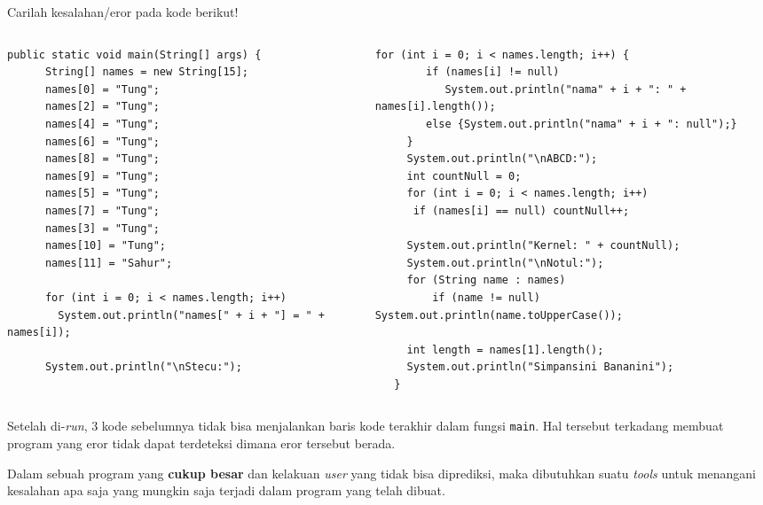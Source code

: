 \documentclass{../praktikum-ppt}
\begin{document}
    \begin{frame}[fragile]
      \begin{game}
        Carilah kesalahan/eror pada kode berikut!
      \end{game}
      \begin{columns}
        \begin{column}{0.45\textwidth}
          \begin{lstlisting}[numberstyle=\tiny\ttfamily\color{lightgray},basicstyle=\tiny\ttfamily]
  public static void main(String[] args) {
      String[] names = new String[15];
      names[0] = "Tung";
      names[2] = "Tung";
      names[4] = "Tung";
      names[6] = "Tung";
      names[8] = "Tung";
      names[9] = "Tung";
      names[5] = "Tung";
      names[7] = "Tung";
      names[3] = "Tung";
      names[10] = "Tung";
      names[11] = "Sahur";

      for (int i = 0; i < names.length; i++) 
        System.out.println("names[" + i + "] = " + names[i]);
      
      System.out.println("\nStecu:");
          \end{lstlisting}
        \end{column}
        \begin{column}{0.45\textwidth}
          \begin{lstlisting}[numberstyle=\tiny\ttfamily\color{lightgray},basicstyle=\tiny\ttfamily]
     for (int i = 0; i < names.length; i++) {
        if (names[i] != null) 
           System.out.println("nama" + i + ": " + names[i].length());
        else {System.out.println("nama" + i + ": null");}
     }
     System.out.println("\nABCD:");
     int countNull = 0;
     for (int i = 0; i < names.length; i++) 
      if (names[i] == null) countNull++;
          
     System.out.println("Kernel: " + countNull);
     System.out.println("\nNotul:");
     for (String name : names) 
         if (name != null) System.out.println(name.toUpperCase());
          
     int length = names[1].length(); 
     System.out.println("Simpansini Bananini");
   }
          \end{lstlisting}
        \end{column}
      \end{columns}
    \end{frame}

    \begin{frame}
      \begin{masalah}
        Setelah di-\textit{run}, 3 kode sebelumnya tidak bisa menjalankan baris kode terakhir dalam fungsi \texttt{main}. Hal tersebut terkadang membuat program yang eror tidak dapat terdeteksi dimana eror tersebut berada.

        Dalam sebuah program yang \textbf{cukup besar} dan kelakuan \textit{user} yang tidak bisa diprediksi, maka dibutuhkan suatu \textit{tools} untuk menangani kesalahan apa saja yang mungkin saja terjadi dalam program yang telah dibuat.
      \end{masalah}
    \end{frame}
\end{document}
